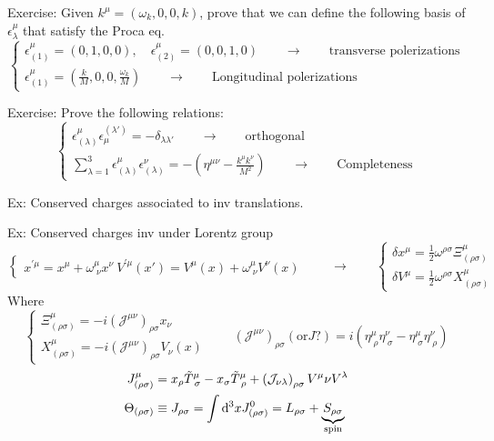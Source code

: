 \begin{example}
Exercise: Given $k^\mu = (\omega_k, 0, 0, k)$, prove that we can define the following basis of $\epsilon^\mu_\lambda$ that satisfy the Proca eq.
\[ \begin{cases}
\epsilon^\mu_{(1)} = (0,1,0,0), \quad \epsilon^\mu_{(2)} = (0,0,1,0) \qquad \to \qquad \text{transverse polerizations} \\
\epsilon^\mu_{(1)} = (\frac{k}{M},0,0,\frac{\omega_k}{M}) \qquad \to \qquad \text{Longitudinal polerizations}
\end{cases} \]
\end{example}
\begin{example}
Exercise: Prove the following relations:
\[ \begin{cases}
\epsilon^\mu_{(\lambda)}\epsilon^{(\lambda')}_\mu = -\delta_{\lambda\lambda'} \qquad \to \qquad \text{orthogonal} \\
\sum^3_{\lambda=1}\epsilon^\mu_{(\lambda)}\epsilon^\nu_{(\lambda)} = - \left(\eta^{\mu\nu}- \frac{k^\mu k^\nu}{M^2}\right) \qquad \to \qquad \text{Completeness}
\end{cases} \]
\end{example}

\begin{example}
Ex: Conserved charges associated to inv translations.\par
Ex: Conserved charges inv under Lorentz group
\[ \begin{cases}
x^{\prime\mu}=x^\mu+\omega^\mu_{\;\nu}x^\nu \
V^{\prime\mu}(x') = V^\mu(x) + \omega^\mu_{\;\nu}V^\nu(x)
\end{cases} \qquad \to \qquad \begin{cases}
\delta x^\mu = \frac{1}{2}\omega^{\rho\sigma}\Xi^\mu_{(\rho\sigma)}\\
\delta V^\mu = \frac{1}{2}\omega^{\rho\sigma}X^\mu_{(\rho\sigma)}
\end{cases} \]
Where
\[ \begin{cases}
\Xi^\mu_{(\rho\sigma)} = -i \left(\mathcal{J}^{\mu\nu}\right)_{\rho\sigma}x_\nu \\
X^\mu_{(\rho\sigma)} = -i \left(\mathcal{J}^{\mu\nu}\right)_{\rho\sigma}V_\nu(x)
\end{cases} \qquad \left(\mathcal{J}^{\mu\nu}\right)_{\rho\sigma} (\text{or} J?) = i \left(\eta^\mu_{\;\rho}\eta^\nu_{\;\sigma} - \eta^\mu_{\;\sigma}\eta^\nu_{\;\rho}\right) \]
\begin{align*}
J^\mu_{(\rho\sigma)} &= x_\rho\tilde{T}^\mu_{\;\sigma}-x_\sigma\tilde{T}^\mu_{\;\rho} + \left(\mathcal{J}_{\nu\lambda}\right)_{\rho\sigma}V^\mu\nu V^\lambda \\
\Theta_{(\rho\sigma)} &\equiv J_{\rho\sigma} = \int \operatorname{d \!}{^3x}J^0_{(\rho\sigma)} = L_{\rho\sigma}+\underbrace{S_{\rho\sigma}}_\text{spin}
\end{align*}
\end{example}

